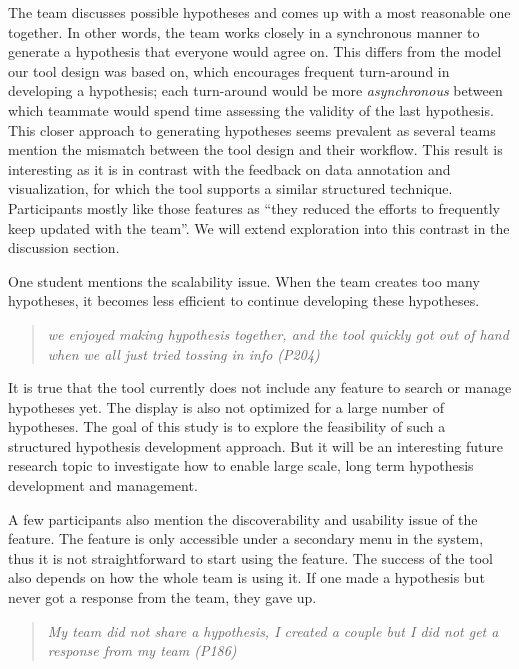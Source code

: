 The team discusses possible hypotheses and comes up with a most reasonable one together. In other words, the team works closely in a synchronous manner to generate a hypothesis that everyone would agree on. This differs from the model our tool design was based on, which encourages frequent turn-around in developing a hypothesis; each turn-around would be more \textit{asynchronous} between which teammate would spend time assessing the validity of the last hypothesis. This closer approach to generating hypotheses seems prevalent as several teams mention the mismatch between the tool design and their workflow. This result is interesting as it is in contrast with the feedback on data annotation and visualization, for which the tool supports a similar structured technique. Participants mostly like those features as ``they reduced the efforts to frequently keep updated with the team''. We will extend exploration into this contrast in the discussion section.



One student mentions the scalability issue. When the team creates too many hypotheses, it becomes less efficient to continue developing these hypotheses. 

\begin{quote}
	\emph{we enjoyed making hypothesis together, and the tool quickly got out of hand when we all just tried tossing in info (P204)}
\end{quote}

It is true that the tool currently does not include any feature to search or manage hypotheses yet. The display is also not optimized for a large number of hypotheses. The goal of this study is to explore the feasibility of such a structured hypothesis development approach. But it will be an interesting future research topic to investigate how to enable large scale, long term hypothesis development and management. 

A few participants also mention the discoverability and usability issue of the feature. The feature is only accessible under a secondary menu in the system, thus it is not straightforward to start using the feature. The success of the tool also depends on how the whole team is using it. If one made a hypothesis but never got a response from the team, they gave up.

\begin{quote}
\emph{My team did not share a hypothesis, I created a couple but I did not get a response from my team (P186)}
\end{quote}

